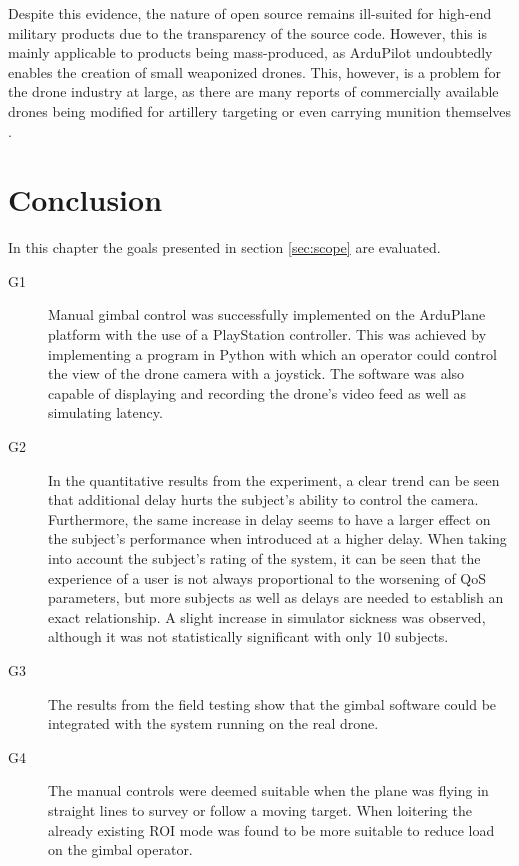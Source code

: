 \documentclass[nofilelist]{cslthse-msc}
\begin{document}
Despite this evidence, the nature of open source remains ill-suited for high-end military products due to the transparency of the source code. However, this is mainly applicable to products being mass-produced, as ArduPilot undoubtedly enables the creation of small weaponized drones. This, however, is a problem for the drone industry at large, as there are many reports of commercially available drones being modified for artillery targeting or even carrying munition themselves \cite{drones-ukraine}. 

\chapter{Conclusion}
In this chapter the goals presented in section \ref{sec:scope} are evaluated.

\begin{description}
   \item[G1]
   Manual gimbal control was successfully implemented on the ArduPlane platform with the use of a PlayStation controller. This was achieved by implementing a program in Python with which an operator could control the view of the drone camera with a joystick. The software was also capable of displaying and recording the drone's video feed as well as simulating latency.

   \item[G2]
   In the quantitative results from the experiment, a clear trend can be seen that additional delay hurts the subject's ability to control the camera. Furthermore, the same increase in delay seems to have a larger effect on the subject's performance when introduced at a higher delay. When taking into account the subject's rating of the system, it can be seen that the experience of a user is not always proportional to the worsening of QoS parameters, but more subjects as well as delays are needed to establish an exact relationship. A slight increase in simulator sickness was observed, although it was not statistically significant with only 10 subjects.

   \item[G3] 
   The results from the field testing show that the gimbal software could be integrated with the system running on the real drone.

   \item[G4]
   The manual controls were deemed suitable when the plane was flying in straight lines to survey or follow a moving target. When loitering the already existing ROI mode was found to be more suitable to reduce load on the gimbal operator.

\end{description}
\end{document}
